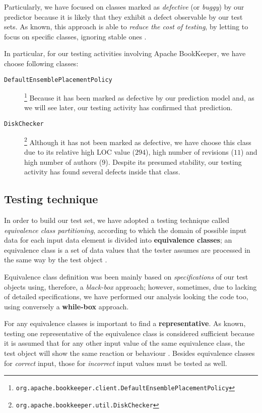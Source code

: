\documentclass[sigconf]{acmart}
\begin{document}
Particularly, we have focused on classes marked as \textit{defective} (or \textit{buggy}) by our predictor because it is likely that they exhibit a defect observable by our test sets. As known, this approach is able to \textit{reduce the cost of testing}, by letting to focus on specific classes, ignoring stable ones \cite{Falessi}.

In particular, for our testing activities involving Apache BookKeeper\texttrademark, we have choose following classes:
\begin{description}
\item[\texttt{DefaultEnsemblePlacementPolicy}]\footnote{\texttt{org.apache.bookkeeper.client.DefaultEnsemblePlacementPolicy}} Because it has been marked as defective by our prediction model and, as we will see later, our testing activity has confirmed that prediction.
\item[\texttt{DiskChecker}]\footnote{\texttt{org.apache.bookkeeper.util.DiskChecker}} Although it has not been marked as defective, we have choose this class due to its relative high LOC value ($294$), high number of revisions ($11$) and high number of authors ($9$). Despite its presumed stability, our testing activity has found several defects inside that class. 
\end{description}

\subsection{Testing technique}

In order to build our test set, we have adopted a testing technique called \textit{equivalence class partitioning}, according to which the domain of possible input data for each input data element is divided
into \textbf{equivalence classes}; an equivalence class is a set of data values that the tester assumes are processed in the same way by the test object \cite{FoundationSoftwareTesting}. 

Equivalence class definition was been mainly based on \textit{specifications} of our test objects using, therefore, a \textit{black-box} approach; however, sometimes, due to lacking of detailed specifications, we have performed our analysis looking the code too, using conversely a \textbf{while-box} approach. 

For any equivalence classes is important to find a \textbf{representative}. As known, testing one representative of the equivalence class is considered sufficient because it is assumed that for any other input value of the same equivalence class, the test object will show the same reaction or behaviour \cite{FoundationSoftwareTesting}. Besides equivalence classes for \textit{correct} input, those for \textit{incorrect} input values must be tested as well.
\end{document}
